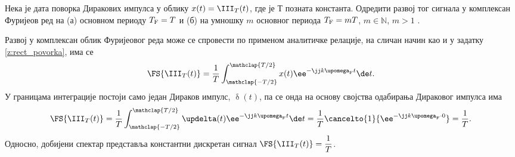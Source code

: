 \PID \label{z:dirak_povorka} \mnImportant
Нека је дата поворка Диракових импулса у облику $x(t) = \III_T(t)$, где је $Т$ позната константа. 
Одредити развој тог сигнала у комплексан Фуријеов ред 
на (а) основном периоду $T_{\rm F} = T$  и (б) на умношку $m$ основног периода $T_{\rm F} = mT$, $m \in \mathbb N$, $m > 1$ .

\RESENJE
Развој у комплексан облик Фуријеовог реда  може се спровести по применом аналитичке релације, на сличан начин као и у 
задатку \ref{z:rect_povorka}, има се 
\begin{eqnarray}
    \FS{\III_{T}(t)} = \dfrac{1}{T} 
    \int_{\mathclap{-T/2}}^{\mathclap{T/2}} x(t) \ee^{-\jj k \upomega_{\rm F} t} \de t. \label{\ID.e1}
\end{eqnarray}
У границама интеграције постоји само један Дираков импулс, $\updelta(t)$, па се онда на основу 
својства одабирања Дираковог импулса има 
\begin{eqnarray}
    \FS{\III_{T}(t)} = \dfrac{1}{T} 
    \int_{\mathclap{-T/2}}^{\mathclap{T/2}} \updelta(t) \ee^{-\jj k \upomega_{\rm F} t} \de t = 
     \dfrac{1}{T} \cancelto{1}{\ee^{-\jj k \upomega_{\rm F} \cdot 0}} = \dfrac{1}{T}.
\end{eqnarray}
Односно, добијени спектар представља константни дискретан сигнал $\FS{\III_{T}(t)} = \dfrac{1}{T}$. 

